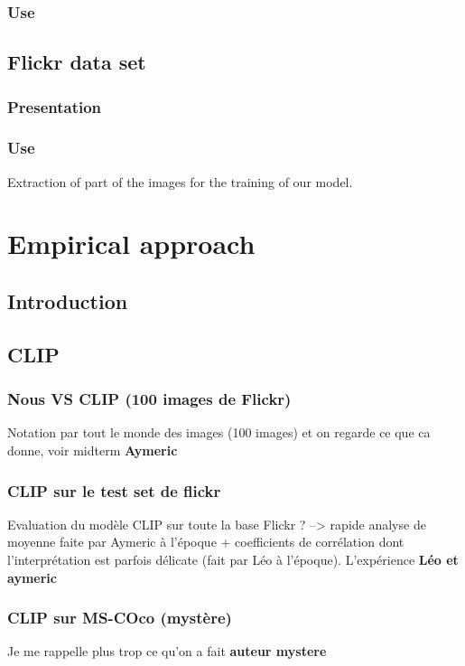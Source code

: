 \documentclass{article}
\begin{document}
\subsubsection{Use}

\subsection{Flickr data set}

\subsubsection{Presentation}

\subsubsection{Use}

Extraction of part of the images for the training of our model.

\pagebreak

\section{Empirical approach}

\subsection{Introduction}

\subsection{CLIP}

\subsubsection{Nous VS CLIP (100 images de Flickr)}
Notation par tout le monde des images (100 images) et on regarde ce que ca donne, voir midterm
\textbf{Aymeric}

\subsubsection{CLIP sur le test set de flickr}
Evaluation du modèle CLIP sur toute la base Flickr ? --> rapide analyse de moyenne faite par Aymeric à l'époque + coefficients de corrélation dont l'interprétation est parfois délicate (fait par Léo à l'époque). L'expérience 
\textbf{Léo et aymeric}

\subsubsection{CLIP sur MS-COco (mystère)}
Je me rappelle plus trop ce qu'on a fait
\textbf{auteur mystere}
\end{document}
